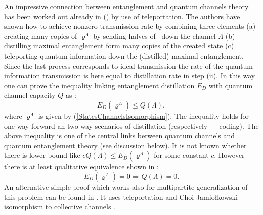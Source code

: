 \documentclass[rmp,12pt,preprint]{revtex4-2}
\begin{document}
An impressive connection between entanglement
and quantum channels theory  has been worked out already
in (\cite{BBPSSW1996,BDSW1996}) by use of teleportation.
The authors have shown how to achieve nonzero
transmission rate by combining three elements (a) creating many
copies of $\varrho^{\Lambda}$ by sending halves of \singlets\ down the channel
$\Lambda$ (b) distilling maximal entanglement
form many copies of the created state (c) teleporting quantum
information down the (distilled) maximal entanglement. Since the
last process corresponds to ideal transmission the rate of the
quantum information transmission is here equal to
distillation rate in step (ii). In this way one can prove the
inequality linking entanglement distillation $E_{D}$ with quantum
channel capacity $Q$ as \cite{BDSW1996}:
\begin{equation}
E_{D}(\varrho^{\Lambda}) \leq Q(\Lambda), \label{DQIneq}
\end{equation}
where $\varrho^\Lambda $  is given by (\ref{StatesChannelsIsomorphism}).
The inequality holds for one-way forward an two-way scenarios of
distillation (respectively --- coding). The above
inequality is one of the central links between quantum channels and
quantum entanglement theory (see discussion below). It is not known
whether there is lower bound like $cQ(\Lambda)\leq
E_{D}(\varrho^{\Lambda})$ for some constant $c$. However there is at
least qualitative equivalence shown in \cite{PHCEJP}:
\begin{equation} E_{D}(\varrho^{\Lambda})=0
\Rightarrow   Q(\Lambda)=0. \label{DQqualitequiv}
\end{equation}
An alternative simple proof which works also for multipartite
generalization of this problem can be found
in \cite{DuHoCi04}. It uses teleportation and Choi-Jamio\l{}kowski
isomorphism to collective channels \cite{CiDuKraLe01}.
\end{document}
